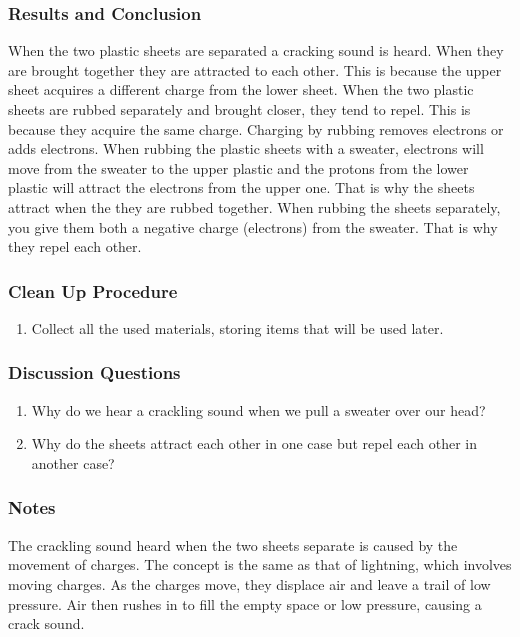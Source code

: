 \subsubsection*{Results and Conclusion}
When the two plastic sheets are separated a cracking sound is heard. When they are brought together they are attracted to each other. This is because the upper sheet acquires a different charge from the lower sheet. 
When the two plastic sheets are rubbed separately and brought closer, they tend to repel. This is because they acquire the same charge. 
Charging by rubbing removes electrons or adds electrons. When rubbing the plastic sheets with a sweater, electrons will move from the sweater to the upper plastic and the protons from the lower plastic will attract the electrons from the upper one. That is why the sheets attract when the they are rubbed together. When rubbing the sheets separately, you give them both a negative charge (electrons) from the sweater. That is why they repel each other. 

\subsubsection*{Clean Up Procedure}
\begin{enumerate}
\item{Collect all the used materials, storing items that will be used later.} 
\end{enumerate}

\subsubsection*{Discussion Questions}
\begin{enumerate}
\item{Why do we hear a crackling sound when we pull a sweater over our head?}
\item{Why do the sheets attract each other in one case but repel each other in another case?}
\end{enumerate}

\subsubsection*{Notes}
The crackling sound heard when the two sheets separate is caused by the movement of charges. The concept is the same as that of lightning, which involves moving charges. As the charges move, they displace air and leave a trail of low pressure. Air then rushes in to fill the empty space or low pressure, causing a crack sound. 

